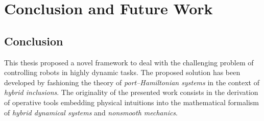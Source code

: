 \chapter{Conclusion and Future Work}
\label{chap:conclusion_future_work}
\minitoc

\thispagestyle{empty}

\newpage
\section{Conclusion}
This thesis proposed a novel framework to deal with the challenging problem of controlling robots in highly dynamic tasks. The proposed solution has been developed by fashioning the theory of \textit{port--Hamiltonian systems} in the context of \textit{hybrid inclusions}.
The originality of the presented work consists in the derivation of operative tools embedding physical intuitions into the mathematical formalism of \textit{hybrid dynamical systems} and \textit{nonsmooth mechanics}. 
%
\newline

